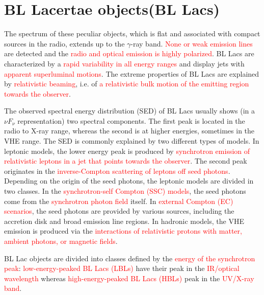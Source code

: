 \documentclass[12pt,a4paper]{article}
\begin{document}
\section{BL Lacertae objects(BL Lacs)}
\cite{2010A&A...521A..69A} The spectrum of these peculiar objects, which is flat and associated with compact sources in the radio,
extends up to the $\gamma$-ray band. \textcolor{red}{None or weak emission lines} are detected and the \textcolor{red}{radio and optical emission is highly polarized}. BL Lacs are characterized by a \textcolor{red}{rapid variability in all energy ranges} and display jets with \textcolor{red}{apparent superluminal motions}. The extreme properties of BL Lacs are explained by \textcolor{red}{relativistic beaming}, i.e. of \textcolor{red}{a relativistic bulk motion of the emitting region towards the observer}.

The observed spectral energy distribution (SED) of BL Lacs usually shows (in a $\nu F_\nu$ representation) two spectral components. The first peak is located in the radio to X-ray range, whereas the second is at higher energies, sometimes in the VHE range. The SED is commonly explained by two different types of models. In leptonic models, the lower energy peak is produced by  \textcolor{red}{synchrotron emission of relativistic leptons in a jet that points towards the observer}. The second peak originates in the  \textcolor{red}{inverse-Compton scattering of leptons off seed photons}. Depending on the origin of the seed photons, the leptonic models are divided in two classes. In the  \textcolor{red}{synchrotron-self Compton (SSC) models}, the seed photons come from the  \textcolor{red}{synchrotron photon field} itself. In \textcolor{red}{external Compton (EC) scenarios}, the seed photons are provided by various sources, including the accretion disk and broad emission line regions. In hadronic models, the VHE emission is produced via the  \textcolor{red}{interactions of relativistic protons with matter, ambient photons, or magnetic fields}.

BL Lac objects are divided into classes defined by the  \textcolor{red}{energy of the synchrotron peak}:  \textcolor{red}{low-energy-peaked BL Lacs (LBLs)} have their peak in the  \textcolor{red}{IR/optical wavelength} whereas  \textcolor{red}{high-energy-peaked BL Lacs (HBLs)} peak in the  \textcolor{red}{UV/X-ray band}.
\end{document}

